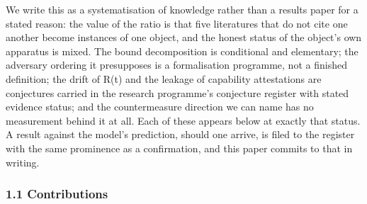 \documentclass[
]{llncs}
\begin{document}
We write this as a systematisation of knowledge rather than a results
paper for a stated reason: the value of the ratio is that five
literatures that do not cite one another become instances of one object,
and the honest status of the object's own apparatus is mixed. The bound
decomposition is conditional and elementary; the adversary ordering it
presupposes is a formalisation programme, not a finished definition; the
drift of R(t) and the leakage of capability attestations are conjectures
carried in the research programme's conjecture register with stated
evidence status; and the countermeasure direction we can name has no
measurement behind it at all. Each of these appears below at exactly
that status. A result against the model's prediction, should one arrive,
is filed to the register with the same prominence as a confirmation, and
this paper commits to that in writing.

\subsubsection{1.1 Contributions}\label{contributions}
\end{document}
